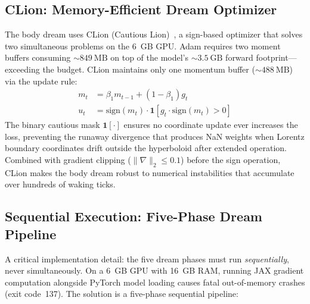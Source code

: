 \documentclass[11pt,a4paper,twocolumn]{article}
\begin{document}
\subsection{CLion: Memory-Efficient Dream Optimizer}

The body dream uses CLion (Cautious Lion)~\cite{clion2025}, a sign-based optimizer that solves two simultaneous problems on the 6~GB GPU.
Adam requires two moment buffers consuming ${\sim}849~\mathrm{MB}$ on top of the model's ${\sim}3.5~\mathrm{GB}$ forward footprint---exceeding the budget.
CLion maintains only one momentum buffer (${\sim}488~\mathrm{MB}$) via the update rule:
\begin{align}
m_t &= \beta_1 m_{t-1} + (1-\beta_1)g_t \label{eq:clion_m} \\
u_t &= \mathrm{sign}(m_t)\cdot\mathbf{1}[g_t \cdot \mathrm{sign}(m_t)>0] \label{eq:clion_u}
\end{align}
The binary cautious mask $\mathbf{1}[\cdot]$ ensures no coordinate update ever increases the loss, preventing the runaway divergence that produces NaN weights when Lorentz boundary coordinates drift outside the hyperboloid after extended operation.
Combined with gradient clipping ($\|\nabla\|_2 \leq 0.1$) before the sign operation, CLion makes the body dream robust to numerical instabilities that accumulate over hundreds of waking ticks.

\subsection{Sequential Execution: Five-Phase Dream Pipeline}

A critical implementation detail: the five dream phases must run \emph{sequentially}, never simultaneously. On a 6~GB GPU with 16~GB RAM, running JAX gradient computation alongside PyTorch model loading causes fatal out-of-memory crashes (exit code~137). The solution is a five-phase sequential pipeline:
\end{document}
